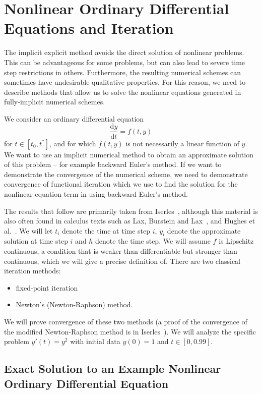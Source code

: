 \chapter{Nonlinear Ordinary Differential Equations and Iteration}

The implicit explicit method avoids the direct solution of nonlinear problems. This can be advantageous for some problems, but can also lead to severe time step restrictions in others. Furthermore, the resulting numerical schemes can sometimes have undesirable qualitative properties. For this reason, we need to describe methods that allow us to solve the nonlinear equations generated in fully-implicit numerical schemes. 

We consider an ordinary differential equation 
\begin{equation}
\frac{\mathrm{d}y}{\mathrm{d}t}=f(t,y) 
\end{equation}
for $t\in[t_{0},t^{*}]$, and for which $f(t,y)$ is not necessarily a linear function of $y$. We want to use an implicit numerical method to obtain an approximate solution of this problem -- for example backward Euler's method. If we want to demonstrate the convergence of the numerical scheme, we need to demonstrate convergence of functional iteration which we use to find the solution for the nonlinear equation term in using backward Euler's method. 

The results that follow are primarily taken from Iserles~\cite{Ise09}, although this material is also often found in calculus texts such as Lax, Burstein and Lax~\cite{LaxBurLax76}, and Hughes et al.~\cite{HugEtAl08}. We will let $t_{i}$ denote the time at time step $i$, $y_{i}$ denote the approximate solution at time step $i$ and $h$ denote the time step. We will assume $f$ is Lipschitz continuous, a condition that is weaker than differentiable but stronger than continuous, which we will give a precise definition of.  There are two classical iteration methods:
\begin{itemize}
\item fixed-point iteration 
\item Newton's (Newton-Raphson) method.
\end{itemize}
We will prove convergence of these two methods (a proof of the convergence of the modified Newton-Raphson method is in Iserles~\cite[p. 130]{Ise09}). We will analyze the specific problem $y'(t)=y^{2}$ with initial data
$y(0)=1$ and $t\in[0,0.99]$. 

\section{Exact Solution to an Example Nonlinear Ordinary Differential Equation}


